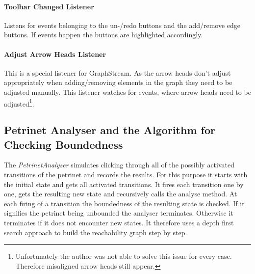 \documentclass[10pt, a4paper]{article}
\begin{document}
\paragraph{Toolbar Changed Listener} Listens for events belonging to the un-/redo buttons and the add/remove edge buttons. If events happen the buttons are highlighted accordingly.

\paragraph{Adjust Arrow Heads Listener} This is a special listener for GraphStream. As the arrow heads don't adjust appropriately when adding/removing elements in the graph they need to be adjusted manually. This listener watches for events, where arrow heads need to be adjusted\footnote{Unfortunately the author was not able to solve this issue for every case. Therefore misaligned arrow heads still appear.}.

\subsection{Petrinet Analyser and the Algorithm for Checking Boundedness}
\label{label:algorithm}



The \textit{PetrinetAnalyser} simulates clicking through all of the possibly activated transitions of the petrinet and records the results. For this purpose it starts with the initial state and gets all activated transitions. It fires each transition one by one, gets the resulting new state and recursively calls the analyse method. At each firing of a transition the boundedness of the resulting state is checked. If it signifies the petrinet being unbounded the analyser terminates. Otherwise it terminates if it does not encounter new states. It therefore uses a depth first search approach to build the reachability graph step by step.


\end{document}
